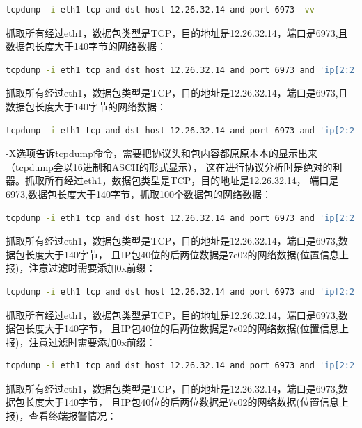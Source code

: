 \documentclass{book}
\begin{document}
\begin{lstlisting}[language=Bash]
tcpdump -i eth1 tcp and dst host 12.26.32.14 and port 6973 -vv
\end{lstlisting}

抓取所有经过eth1，数据包类型是TCP，目的地址是12.26.32.14，端口是6973,且数据包长度大于140字节的网络数据：

\begin{lstlisting}[language=Bash]
tcpdump -i eth1 tcp and dst host 12.26.32.14 and port 6973 and 'ip[2:2]>140' -vv
\end{lstlisting}

抓取所有经过eth1，数据包类型是TCP，目的地址是12.26.32.14，端口是6973,且数据包长度大于140字节的网络数据：

\begin{lstlisting}[language=Bash]
tcpdump -i eth1 tcp and dst host 12.26.32.14 and port 6973 and 'ip[2:2]>140' -vv -X
\end{lstlisting}

-X选项告诉tcpdump命令，需要把协议头和包内容都原原本本的显示出来（tcpdump会以16进制和ASCII的形式显示），
这在进行协议分析时是绝对的利器。抓取所有经过eth1，数据包类型是TCP，目的地址是12.26.32.14，
端口是6973,数据包长度大于140字节，抓取100个数据包的网络数据：

\begin{lstlisting}[language=Bash]
tcpdump -i eth1 tcp and dst host 12.26.32.14 and port 6973 and 'ip[2:2]>140' -vv -X -c 100
\end{lstlisting}

抓取所有经过eth1，数据包类型是TCP，目的地址是12.26.32.14，端口是6973,数据包长度大于140字节，
且IP包40位的后两位数据是7e02的网络数据(位置信息上报)，注意过滤时需要添加0x前缀：

\begin{lstlisting}[language=Bash]
tcpdump -i eth1 tcp and dst host 12.26.32.14 and port 6973 and 'ip[2:2]>140 and ip[40,2]=0x7e02' -vv -X -c 100
\end{lstlisting}

抓取所有经过eth1，数据包类型是TCP，目的地址是12.26.32.14，端口是6973,数据包长度大于140字节，
且IP包40位的后两位数据是7e02的网络数据(位置信息上报)，注意过滤时需要添加0x前缀：

\begin{lstlisting}[language=Bash]
tcpdump -i eth1 tcp and dst host 12.26.32.14 and port 6973 and 'ip[2:2]>140 and ip[40,2]=0x7e02' -vv -X -c 100
\end{lstlisting}

抓取所有经过eth1，数据包类型是TCP，目的地址是12.26.32.14，端口是6973,数据包长度大于140字节，
且IP包40位的后两位数据是7e02的网络数据(位置信息上报)，查看终端报警情况：
\end{document}
